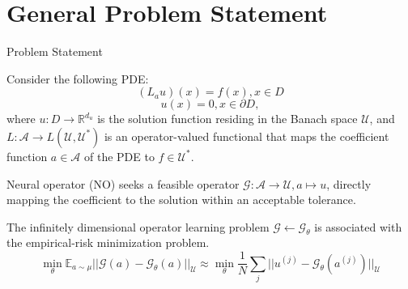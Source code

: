 \documentclass{beamer}
\begin{document}
\section{General Problem Statement}
\begin{frame}{Problem Statement}
    \begin{block}{}
        Consider the following PDE:
        $$
        (L_au)(x) = f(x), x \in D
        $$
        $$
        u(x) = 0, x \in \partial D,
        $$
        where $u : D \rightarrow \mathbb{R}^{d_u}$ is the solution function residing in the Banach space $\mathcal{U}$, and $L: \mathcal{A} \rightarrow L(\mathcal{U}, \mathcal{U}^*)$ is an operator-valued functional that maps the coefficient function $a \in \mathcal{A}$ of the PDE to $f \in \mathcal{U}^*$.

        Neural operator (NO) seeks a feasible operator $\mathcal{G} : \mathcal{A} \rightarrow \mathcal{U}, a \mapsto u$, directly mapping the coefficient to the solution within an acceptable tolerance.
    \end{block}

    \begin{block}{}
        The infinitely dimensional operator learning problem $\mathcal{G} \leftarrow \mathcal{G}_{\theta}$ is associated with the empirical-risk minimization problem.
        $$
        \min_\theta \mathbb{E}_{a \sim \mu} ||\mathcal{G}(a) - \mathcal{G}_\theta(a)||_{\mathcal{U}} \approx \min_{\theta} \frac{1}{N} \sum_j ||u^{(j)} - \mathcal{G}_\theta(a^{(j)})||_{\mathcal{U}}
        $$

    \end{block}

\end{frame}
\end{document}
